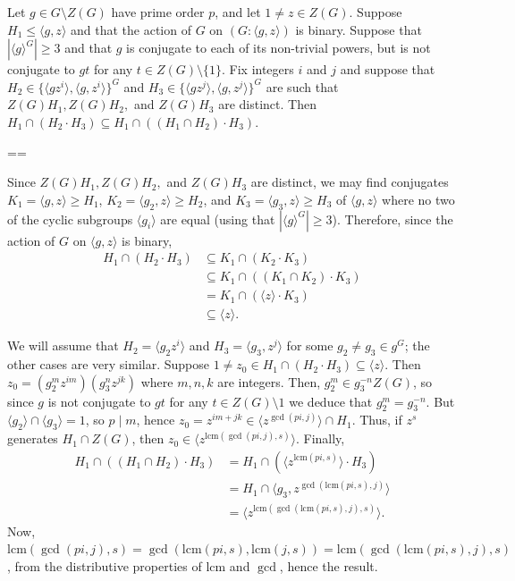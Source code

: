 \documentclass[11pt, a4paper]{amsart}
\makeatletter
\newcommand\lcm{\mathrm{lcm}}
\renewcommand{\proofname}{Proof}
\renewenvironment{proof}[1][\proofname]{\par
  \pushQED{\qed}  \normalfont \partopsep=\z@skip \topsep=\z@skip
  \trivlist
  \item[\hskip\labelsep
        \scshape
    #1\@addpunct{.}]\ignorespaces
}{  \popQED\endtrivlist\@endpefalse
}
\makeatother
\begin{document}
\begin{lemma}\label{lem:intrans}
    Let $g\in G\setminus Z(G)$ have prime order $p$, and let $1\ne z\in Z(G)$.     Suppose $H_1\leq \langle g,z\rangle$ and that the action of $G$ on $(G:\langle g,z\rangle)$ is binary.     Suppose that $|\langle g\rangle^G|\geq 3$ and that $g$ is conjugate to each of its non-trivial powers, but is not conjugate to $gt$ for any $t\in Z(G)\setminus \{1\}$. Fix integers $i$ and $j$ and suppose that $H_2\in\{\langle gz^i\rangle,\langle g,z^i\rangle\}^G$ and $H_3\in \{\langle gz^j\rangle,\langle g,z^j\rangle\}^G$ are such that $Z(G)H_1, Z(G)H_2,$ and $Z(G)H_3$ are distinct. Then $H_1\cap (H_2\cdot H_3)\subseteq H_1\cap((H_1\cap H_2)\cdot H_3)$.
\end{lemma}
\begin{proof}
     Since $Z(G)H_1,Z(G) H_2,$ and $Z(G)H_3$ are distinct, we may find conjugates $K_1=\langle g,z\rangle\geq H_1$, $K_2=\langle g_2,z\rangle\geq H_2$, and $K_3=\langle g_3,z\rangle\geq H_3$ of $\langle g,z\rangle$ where no two of the cyclic subgroups $\langle g_i\rangle$ are equal (using that $|\langle g\rangle^G|\geq 3$). Therefore, since the action of $G$ on $\langle g,z\rangle $ is binary, \begin{align*}
            H_1\cap (H_2\cdot H_3)&\subseteq K_1\cap (K_2\cdot K_3)\\&\subseteq K_1\cap ((K_1\cap K_2)\cdot K_3)\\&=K_1\cap (\langle z\rangle\cdot K_3)\\&\subseteq\langle z\rangle.
        \end{align*}
    
     We will assume that $H_2=\langle g_2z^i\rangle$ and $H_3=\langle g_3,z^j\rangle$ for some $g_2\ne g_3\in g^G$; the other cases are very similar. Suppose $1\ne z_0\in H_1\cap (H_2\cdot H_3)\subseteq\langle z\rangle$. Then $z_0=(g_2^mz^{im})(g_3^nz^{jk})$ where $m,n,k$ are integers. Then, $g_2^m\in g_3^{-n}Z(G)$, so since $g$ is not conjugate to $gt$ for any $t\in Z(G)\setminus{1}$ we deduce that $g_2^m=g_3^{-n}$. But $\langle g_2\rangle\cap\langle g_3\rangle=1$, so $p\mid m$, hence $z_0=z^{im+jk}\in \langle z^{\gcd(pi,j)}\rangle\cap H_1$. Thus, if $z^s$ generates $H_1\cap Z(G)$, then $z_0\in \langle z^{\lcm(\gcd(pi,j),s)}\rangle$.
    Finally, \begin{align*}
             H_1\cap ((H_1\cap H_2)\cdot H_3)&= H_1\cap (\langle z^{\lcm(pi,s)}\rangle\cdot H_3)\\&=H_1\cap \langle g_3,z^{\gcd(\lcm(pi,s),j)}\rangle\\&= \langle z^{\lcm(\gcd(\lcm(pi,s),j),s)}\rangle.
        \end{align*}
    Now, $\lcm(\gcd(pi,j),s)=\gcd(\lcm(pi,s),\lcm(j,s))=\lcm(\gcd(\lcm(pi,s),j),s)$, from the distributive properties of $\lcm$ and $\gcd$, hence the result.
   \end{proof}
\end{document}
